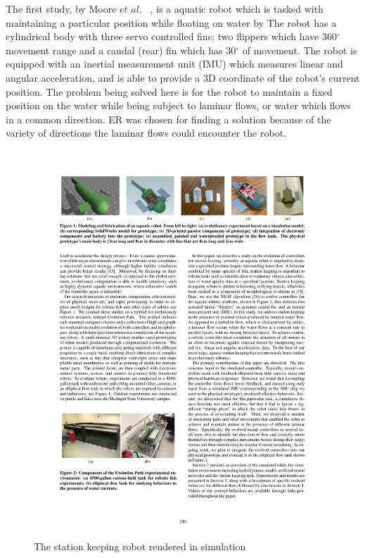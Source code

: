 \documentclass{sig-alternate}
\begin{document}
	The first study, by Moore $et$ $al.$ ~\cite{Moore:2013:ESK:2463372.2463402}, is a aquatic robot which is tasked with maintaining a particular position while floating on water by  The robot has a cylindrical body with three servo controlled fins; two flippers which have 360$^\circ$ movement range and a caudal (rear) fin which has 30$^\circ$ of movement. The robot is equipped with an inertial measurement unit (IMU) which measures linear and angular acceleration, and is able to provide a 3D coordinate of the robot's current position. The problem being solved here is for the robot to maintain a fixed position on the water while being subject to laminar flows, or water which flows in a common direction. ER was chosen for finding a solution because of the variety of directions the laminar flows could encounter the robot.

\begin{figure}%
\center
  \includegraphics[scale=1]{sr2}
\caption{The station keeping robot rendered in simulation}
\label{fig:wRobot}
\end{figure}
\end{document}
